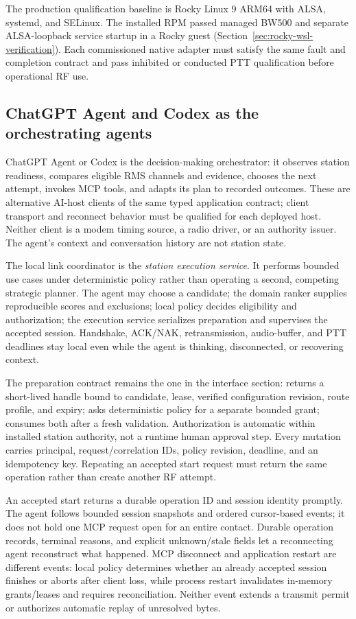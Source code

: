 The production qualification baseline is Rocky Linux 9 ARM64 with ALSA,
systemd, and SELinux. The installed RPM passed managed BW500 and separate
ALSA-loopback service startup in a Rocky guest
(Section~\ref{sec:rocky-wsl-verification}). Each commissioned native
adapter must satisfy the same fault and completion contract and pass
inhibited or conducted PTT qualification before operational RF use.

\subsection{ChatGPT Agent and Codex as the orchestrating agents}
ChatGPT Agent or Codex is the decision-making orchestrator: it observes station
readiness, compares eligible RMS channels and evidence, chooses the next
attempt, invokes MCP tools, and adapts its plan to recorded outcomes. These
are alternative AI-host clients of the same typed application contract;
client transport and reconnect behavior must be qualified for each deployed
host. Neither client is a modem timing source, a radio driver, or an authority
issuer. The agent's context and conversation history are not station state.

The local link coordinator is the \emph{station execution service}. It performs
bounded use cases under deterministic policy rather than operating a second,
competing strategic planner. The agent may choose a candidate; the domain
ranker supplies reproducible scores and exclusions; local policy decides
eligibility and authorization; the execution service serializes preparation
and supervises the accepted session. Handshake, ACK/NAK, retransmission,
audio-buffer, and PTT deadlines stay local even while the agent is thinking,
disconnected, or recovering context.

The preparation contract remains the one in the interface section:
 returns a short-lived handle bound to candidate,
lease, verified configuration revision, route profile, and expiry;
 asks deterministic policy for a
separate bounded grant;  consumes both after a fresh
validation. Authorization is automatic within installed station authority,
not a runtime human approval step. Every mutation carries principal,
request/correlation IDs, policy revision, deadline, and an idempotency key.
Repeating an accepted start request must return the same operation rather than
create another RF attempt.

An accepted start returns a durable operation ID and session identity promptly.
The agent follows bounded session snapshots and ordered cursor-based events;
it does not hold one MCP request open for an entire contact. Durable operation
records, terminal reasons, and explicit unknown/stale fields let a reconnecting
agent reconstruct what happened. MCP disconnect and application restart are
different events: local policy determines whether an already accepted session
finishes or aborts after client loss, while process restart invalidates
in-memory grants/leases and requires reconciliation. Neither event extends a
transmit permit or authorizes automatic replay of unresolved bytes.

